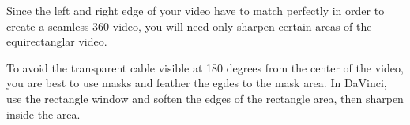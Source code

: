 \begin{fullwidth}

Since the left and right edge of your video have to match perfectly in order to create a seamless 360 video, you will need only sharpen certain areas of the equirectanglar video.

To avoid the transparent cable visible at 180 degrees from the center of the video, you are best to use masks and feather the egdes to the mask area. In DaVinci, use the rectangle window and soften the edges of the rectangle area, then sharpen inside the area.



\end{fullwidth}